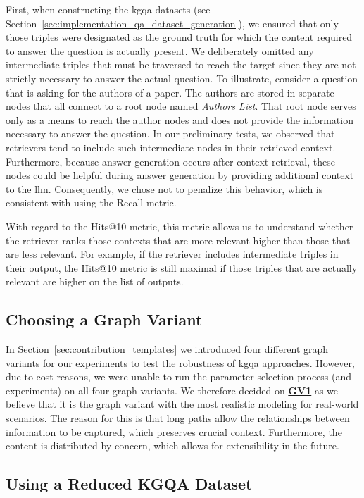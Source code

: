 First, when constructing the \gls{kgqa} datasets (see Section~\ref{sec:implementation_qa_dataset_generation}), we ensured that only those triples were designated as the ground truth for which the content required to answer the question is actually present. We deliberately omitted any intermediate triples that must be traversed to reach the target since they are not strictly necessary to answer the actual question. To illustrate, consider a question that is asking for the authors of a paper. The authors are stored in separate nodes that all connect to a root node named \emph{Authors List}. That root node serves only as a means to reach the author nodes and does not provide the information necessary to answer the question. In our preliminary tests, we observed that retrievers tend to include such intermediate nodes in their retrieved context. Furthermore, because answer generation occurs after context retrieval, these nodes could be helpful during answer generation by providing additional context to the \gls{llm}. Consequently, we chose not to penalize this behavior, which is consistent with using the Recall metric.

With regard to the Hits@10 metric, this metric allows us to understand whether the retriever ranks those contexts that are more relevant higher than those that are less relevant. For example, if the retriever includes intermediate triples in their output, the Hits@10 metric is still maximal if those triples that are actually relevant are higher on the list of outputs.

\subsection{Choosing a Graph Variant}
\label{sec:selection_planning_graph_variant}

In Section~\ref{sec:contribution_templates} we introduced four different graph variants for our experiments to test the robustness of \gls{kgqa} approaches. However, due to cost reasons, we were unable to run the parameter selection process (and experiments) on all four graph variants. We therefore decided on \hyperref[enum:gv1]{\textbf{GV1}} as we believe that it is the graph variant with the most realistic modeling for real-world scenarios. The reason for this is that long paths allow the relationships between information to be captured, which preserves crucial context. Furthermore, the content is distributed by concern, which allows for extensibility in the future.

\subsection{Using a Reduced KGQA Dataset}
\label{sec:selection_planning_reduced_qa}

